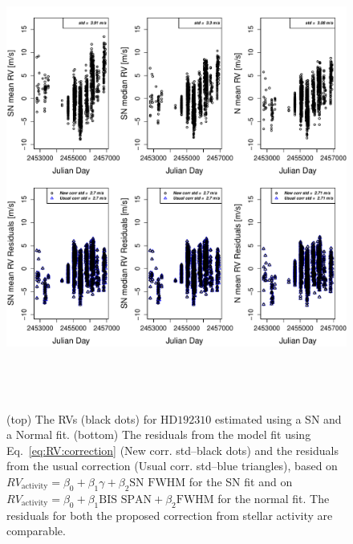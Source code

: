 \documentclass{aa}
\begin{document}
\begin{figure} 
\begin{center}
\includegraphics[height = 6in]{NEW_CORRECTIONHD19231_[3]CorrectionActivity_RadialVelocity_vs_time.pdf} 
   \caption{(top) The RVs (black dots) for $\text{HD}192310$ estimated using a SN and a Normal fit.
 (bottom) The residuals from the model fit using Eq.~\ref{eq:RV:correction} (New corr. std--black dots) and the residuals from the usual correction (Usual corr. std--blue triangles), based on $RV_{\text{activity}}=\beta_0+\beta_1 \gamma + \beta_2 \text{SN FWHM}$ for the SN fit and on $RV_{\text{activity}}=\beta_0+\beta_1 \text{BIS SPAN} + \beta_2 \text{FWHM}$ for the normal fit. The residuals for both the proposed correction from stellar activity are comparable.
 }
   \label{fig:HD192310:correctionRV}
\end{center}
\end{figure}
\end{document}
